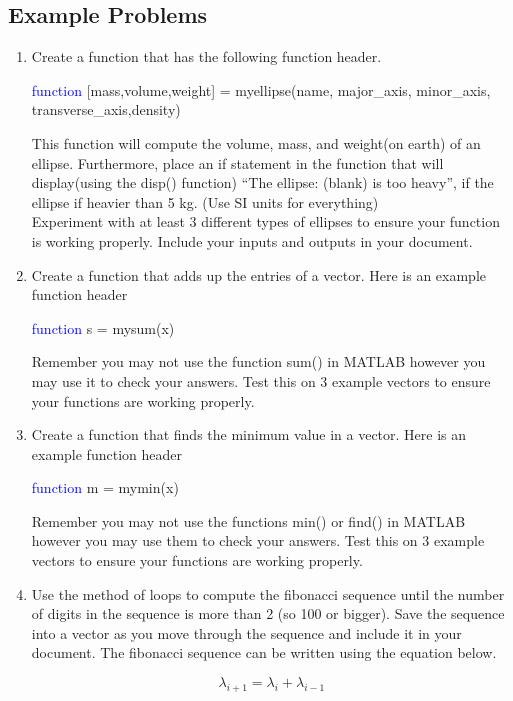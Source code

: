 \subsection{Example Problems}

\begin{enumerate}

\item Create a function that has the following function header. 

\textcolor{blue}{function} [mass,volume,weight] = myellipse(name, major\_axis, minor\_axis,
transverse\_axis,density)

This function will compute the volume, mass, and weight(on earth) of
an ellipse. Furthermore, place an if statement in the function that
will display(using the disp() function) ``The ellipse: (blank) is too
heavy'', if the ellipse if heavier than 5 kg. (Use SI units for
everything) 
\ \\

\noindent Experiment with at least 3 different types of ellipses to
ensure your function is working properly. Include your inputs and
outputs in your document. 

\item Create a function that adds up the entries of a vector. Here is
  an example function header

\textcolor{blue}{function} s = mysum(x)

Remember you may not use the function sum() in MATLAB however you may
use it to check your answers. Test this on 3 example vectors to
ensure your functions are working properly.  

\item Create a function that finds the minimum value in a vector. Here
  is an example function header

\textcolor{blue}{function} m = mymin(x)

Remember you may not use the functions min() or find() in MATLAB
however you may use them to check your answers. Test this on 3 example
vectors to ensure your functions are working properly. 

\item Use the method of loops to compute the fibonacci sequence until
the number of digits in the sequence is more than 2 (so 100 or
bigger). Save the sequence into a vector as you move through the
sequence and include it in your document. The fibonacci sequence can be
written using the equation below. 

\begin{equation}
\lambda_{i+1} = \lambda_{i} + \lambda_{i-1}
\end{equation}


\end{enumerate}
